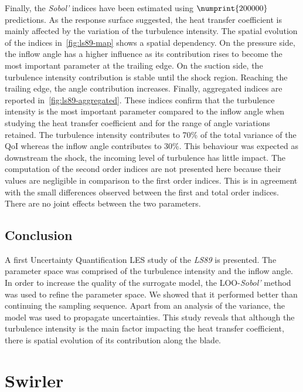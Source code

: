 Finally, the \textit{Sobol'} indices have been estimated using $\numprint{200000}$ predictions. As the response surface suggested, the heat transfer coefficient is mainly affected by the variation of the turbulence intensity. The spatial evolution of the indices in~\cref{fig:ls89-map} shows a spatial dependency. On the pressure side, the inflow angle has a higher influence as its contribution rises to become the most important parameter at the trailing edge. On the suction side, the turbulence intensity contribution is stable until the shock region. Reaching the trailing edge, the angle contribution increases. Finally, aggregated indices are reported in~\cref{fig:ls89-aggregated}. These indices confirm that the turbulence intensity is the most important parameter compared to the inflow angle when studying the heat transfer coefficient and for the range of angle variations retained. The turbulence intensity contributes to 70\% of the total variance of the QoI whereas the inflow angle contributes to 30\%. This behaviour was expected as downstream the shock, the incoming level of turbulence has little impact. The computation of the second order indices are not presented here because their values are negligible in comparison to the first order indices. This is in agreement with the small differences observed between the first and total order indices. There are no joint effects between the two parameters.


\section{Conclusion}\label{sec:ls89_ccl}

A first Uncertainty Quantification LES study of the \textit{LS89} is presented. The parameter space was comprised of the turbulence intensity and the inflow angle. In order to increase the quality of the surrogate model, the LOO-\textit{Sobol'} method was used to refine the parameter space. We showed that it performed better than continuing the sampling sequence. Apart from an analysis of the variance, the model was used to propagate uncertainties. This study reveals that although the turbulence intensity is the main factor impacting the heat transfer coefficient, there is spatial evolution of its contribution along the blade.


\chapter{Swirler}

